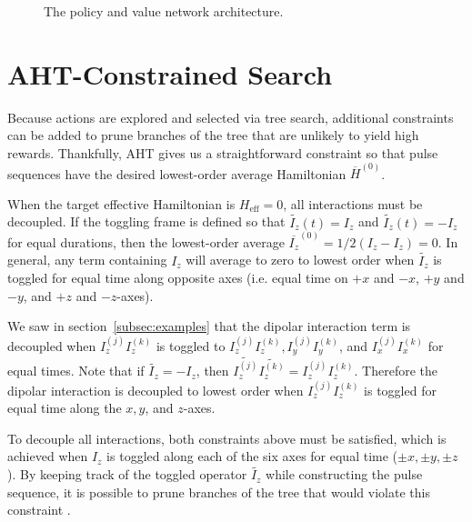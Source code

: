 \begin{figure}[H]
    \centering
    
    \caption{The policy and value network architecture.}
    \label{fig:nn}
\end{figure}


\section{AHT-Constrained Search}

Because actions are explored and selected via tree search, additional constraints can be added to prune branches of the tree that are unlikely to yield high rewards. Thankfully, AHT gives us a straightforward constraint so that pulse sequences have the desired lowest-order average Hamiltonian $\overline{H}^{(0)}$.

When the target effective Hamiltonian is $H_\text{eff} = 0$, all interactions must be decoupled. If the toggling frame is defined so that $\widetilde{I_z}(t) = I_z$ and $\widetilde{I_z}(t) = -I_z$ for equal durations, then the lowest-order average $\overline{I_z}^{(0)} = 1/2(I_z - I_z) = 0$. In general, any term containing $I_z$ will average to zero to lowest order when $\widetilde{I_z}$ is toggled for equal time along opposite axes (i.e. equal time on $+x$ and $-x$, $+y$ and $-y$, and $+z$ and $-z$-axes).

We saw in section~\ref{subsec:examples} that the dipolar interaction term is decoupled when $I_z^{(j)}I_z^{(k)}$ is toggled to $I_z^{(j)}I_z^{(k)}, I_y^{(j)}I_y^{(k)}$, and $I_x^{(j)}I_x^{(k)}$ for equal times. Note that if $\widetilde{I_z} = -I_z$, then $\widetilde{I_z^{(j)}}\widetilde{I_z^{(k)}} = I_z^{(j)}I_z^{(k)}$.
Therefore the dipolar interaction is decoupled to lowest order when $I_z^{(j)}I_z^{(k)}$ is toggled for equal time along the $x, y$, and $z$-axes.

To decouple all interactions, both constraints above must be satisfied, which is achieved when $I_z$ is toggled along each of the six axes for equal time ($\pm x, \pm y, \pm z$). By keeping track of the toggled operator $\widetilde{I_z}$ while constructing the pulse sequence, it is possible to prune branches of the tree that would violate this constraint%
.



